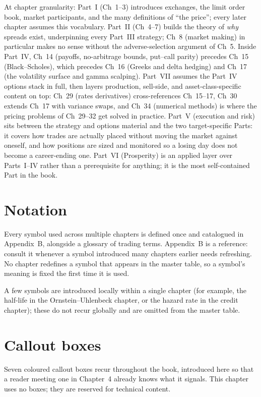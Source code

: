 At chapter granularity: Part~I (Ch~1--3) introduces exchanges, the
limit order book, market participants, and the many definitions of
``the price''; every later chapter assumes this vocabulary. Part~II
(Ch~4--7) builds the theory of \emph{why} spreads exist, underpinning
every Part~III strategy; Ch~8 (market making) in particular makes no
sense without the adverse-selection argument of Ch~5. Inside Part~IV,
Ch~14 (payoffs, no-arbitrage bounds, put--call parity) precedes Ch~15
(Black--Scholes), which precedes Ch~16 (Greeks and delta hedging) and
Ch~17 (the volatility surface and gamma scalping). Part~VII assumes the
Part~IV options stack in full, then layers production, sell-side, and
asset-class-specific content on top: Ch~29 (rates derivatives)
cross-references Ch~15--17, Ch~30 extends Ch~17 with variance swaps,
and Ch~34 (numerical methods) is where the pricing problems of
Ch~29--32 get solved in practice. Part~V (execution and risk) sits
between the strategy and options material and the two target-specific
Parts: it covers how trades are actually placed without moving the
market against oneself, and how positions are sized and monitored so a
losing day does not become a career-ending one. Part~VI (Prosperity) is
an applied layer over Parts~I--IV rather than a prerequisite for
anything; it is the most self-contained Part in the book.

\section{Notation}
\label{sec:notation}

Every symbol used across multiple chapters is defined once and
catalogued in Appendix~B, alongside a glossary of trading terms.
Appendix~B is a reference: consult it whenever a symbol introduced
many chapters earlier needs refreshing. No chapter redefines a symbol
that appears in the master table, so a symbol's meaning is fixed the
first time it is used.

A few symbols are introduced locally within a single chapter (for
example, the half-life in the Ornstein--Uhlenbeck chapter, or the
hazard rate in the credit chapter); these do not recur globally and
are omitted from the master table.

\section{Callout boxes}
\label{sec:callouts}

Seven coloured callout boxes recur throughout the book, introduced
here so that a reader meeting one in Chapter~4 already knows what it
signals. This chapter uses no boxes; they are reserved for technical
content.

